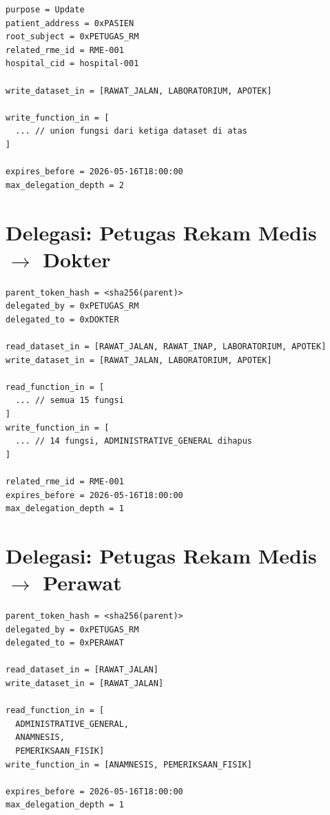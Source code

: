 \documentclass[bahasa, 12pt, a4paper, onecolumn, oneside, final]{report}
\begin{document}
\begin{lstlisting}[caption={Contoh \textit{Caveat} Token \texttt{Update} Awal untuk Petugas Rekam Medis}, label={lst:contoh-token-pembaruan-awal-rekam-medis}]
purpose = Update
patient_address = 0xPASIEN
root_subject = 0xPETUGAS_RM
related_rme_id = RME-001
hospital_cid = hospital-001

write_dataset_in = [RAWAT_JALAN, LABORATORIUM, APOTEK]

write_function_in = [
  ... // union fungsi dari ketiga dataset di atas
]

expires_before = 2026-05-16T18:00:00
max_delegation_depth = 2
\end{lstlisting}

\section*{Delegasi: Petugas Rekam Medis $\rightarrow$ Dokter}
\label{subsec:contoh-caveat-token-macaroon-delegasi-dokter}

\begin{lstlisting}[caption={Contoh \textit{Caveat} Delegasi Petugas Rekam Medis $\rightarrow$ Dokter}, label={lst:contoh-token-delegasi-dokter}]
parent_token_hash = <sha256(parent)>
delegated_by = 0xPETUGAS_RM
delegated_to = 0xDOKTER

read_dataset_in = [RAWAT_JALAN, RAWAT_INAP, LABORATORIUM, APOTEK]
write_dataset_in = [RAWAT_JALAN, LABORATORIUM, APOTEK]

read_function_in = [
  ... // semua 15 fungsi
]
write_function_in = [
  ... // 14 fungsi, ADMINISTRATIVE_GENERAL dihapus
]

related_rme_id = RME-001
expires_before = 2026-05-16T18:00:00
max_delegation_depth = 1
\end{lstlisting}

\section*{Delegasi: Petugas Rekam Medis $\rightarrow$ Perawat}
\label{subsec:contoh-caveat-token-macaroon-delegasi-perawat}

\begin{lstlisting}[caption={Contoh \textit{Caveat} Delegasi Petugas Rekam Medis $\rightarrow$ Perawat}, label={lst:contoh-token-delegasi-perawat}]
parent_token_hash = <sha256(parent)>
delegated_by = 0xPETUGAS_RM
delegated_to = 0xPERAWAT

read_dataset_in = [RAWAT_JALAN]
write_dataset_in = [RAWAT_JALAN]

read_function_in = [
  ADMINISTRATIVE_GENERAL, 
  ANAMNESIS, 
  PEMERIKSAAN_FISIK]
write_function_in = [ANAMNESIS, PEMERIKSAAN_FISIK]

expires_before = 2026-05-16T18:00:00
max_delegation_depth = 1
\end{lstlisting}
\end{document}

